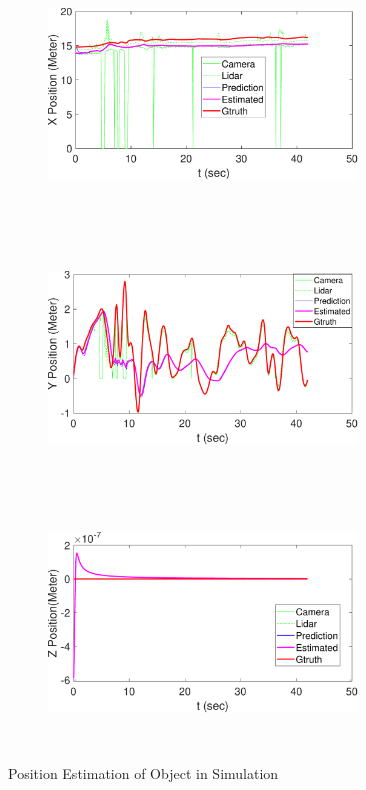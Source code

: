 \begin{figure}
    \centering
    \begin{subfigure}
        \centering
        \includegraphics[height=6.5cm,width=0.9\textwidth]{Images/X_pos.pdf}
    \end{subfigure}
    \begin{subfigure}
        \centering
        \includegraphics[height=6.5cm,width=0.9\textwidth]{Images/Y_pos.pdf}
    \end{subfigure}
    \begin{subfigure}
        \centering
        \includegraphics[height=6.5cm,width=0.9\textwidth]{Images/Z_pos.pdf}
    \end{subfigure}
    \caption{Position Estimation of Object in Simulation}
    \label{Stateestimation}
\end{figure}

